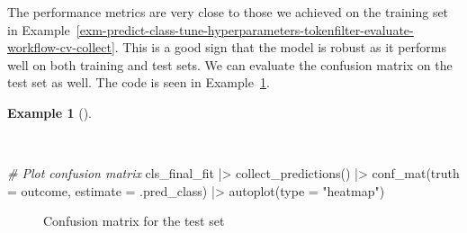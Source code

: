 \documentclass[
  letterpaper,
  krantz1]{latex/krantz-mod}
\newenvironment{Shaded}{\begin{snugshade}}{\end{snugshade}}
\newcommand{\AttributeTok}[1]{\textcolor[rgb]{0.00,0.00,0.00}{#1}}
\newcommand{\CommentTok}[1]{\textcolor[rgb]{0.00,0.00,0.00}{\textit{#1}}}
\newcommand{\FunctionTok}[1]{\textcolor[rgb]{0.00,0.00,0.00}{#1}}
\newcommand{\NormalTok}[1]{\textcolor[rgb]{0.00,0.00,0.00}{#1}}
\newcommand{\SpecialCharTok}[1]{\textcolor[rgb]{0.00,0.00,0.00}{#1}}
\newcommand{\StringTok}[1]{\textcolor[rgb]{0.00,0.00,0.00}{#1}}
\theoremstyle{definition}
\newtheorem{example}{Example}[chapter]
\theoremstyle{definition}
\theoremstyle{remark}
\begin{document}
The performance metrics are very close to those we achieved on the
training set in
Example~\ref{exm-predict-class-tune-hyperparameters-tokenfilter-evaluate-workflow-cv-collect}.
This is a good sign that the model is robust as it performs well on both
training and test sets. We can evaluate the confusion matrix on the test
set as well. The code is seen in
Example~\ref{exm-predict-class-tune-hyperparameters-evaluate-test-confusion}.

\begin{example}[]\protect\hypertarget{exm-predict-class-tune-hyperparameters-evaluate-test-confusion}{}\label{exm-predict-class-tune-hyperparameters-evaluate-test-confusion}

~

\begin{Shaded}
\begin{Highlighting}[numbers=left,,]
\CommentTok{\# Plot confusion matrix}
\NormalTok{cls\_final\_fit }\SpecialCharTok{|\textgreater{}}
  \FunctionTok{collect\_predictions}\NormalTok{() }\SpecialCharTok{|\textgreater{}}
  \FunctionTok{conf\_mat}\NormalTok{(}\AttributeTok{truth =}\NormalTok{ outcome, }\AttributeTok{estimate =}\NormalTok{ .pred\_class) }\SpecialCharTok{|\textgreater{}}
  \FunctionTok{autoplot}\NormalTok{(}\AttributeTok{type =} \StringTok{"heatmap"}\NormalTok{)}
\end{Highlighting}
\end{Shaded}

\end{example}

\begin{figure}[!htb]


\caption{\label{fig-class-tune-hyperparameters-evaluate-workflow-cv-confusion}Confusion
matrix for the test set}

\end{figure}%
\end{document}
